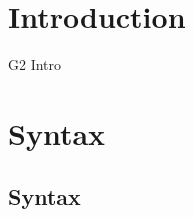 \documentclass[sigconf,usenames,dvipsnames,svgnames,table]{acmart}
\def \sysname {\textsc{G2}\xspace}
\begin{document}

\maketitle

\section{Introduction}
\sysname Intro
\cite{2011gem5sim}
\cite{2019stt}

  \section {Syntax}
    \subsection{Syntax}\label{sec:spec:synt}
\end{document}
